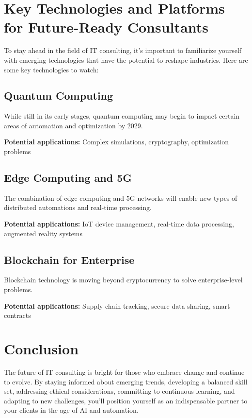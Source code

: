 \section{Key Technologies and Platforms for Future-Ready Consultants}

To stay ahead in the field of IT consulting, it's important to familiarize yourself with emerging technologies that have the potential to reshape industries. Here are some key technologies to watch:

\subsection{Quantum Computing}

While still in its early stages, quantum computing may begin to impact certain areas of automation and optimization by 2029.

\textbf{Potential applications:} Complex simulations, cryptography, optimization problems

\subsection{Edge Computing and 5G}

The combination of edge computing and 5G networks will enable new types of distributed automations and real-time processing.

\textbf{Potential applications:} IoT device management, real-time data processing, augmented reality systems

\subsection{Blockchain for Enterprise}

Blockchain technology is moving beyond cryptocurrency to solve enterprise-level problems.

\textbf{Potential applications:} Supply chain tracking, secure data sharing, smart contracts


\section{Conclusion}

The future of IT consulting is bright for those who embrace change and continue to evolve. By staying informed about emerging trends, developing a balanced skill set, addressing ethical considerations, committing to continuous learning, and adapting to new challenges, you'll position yourself as an indispensable partner to your clients in the age of AI and automation.

